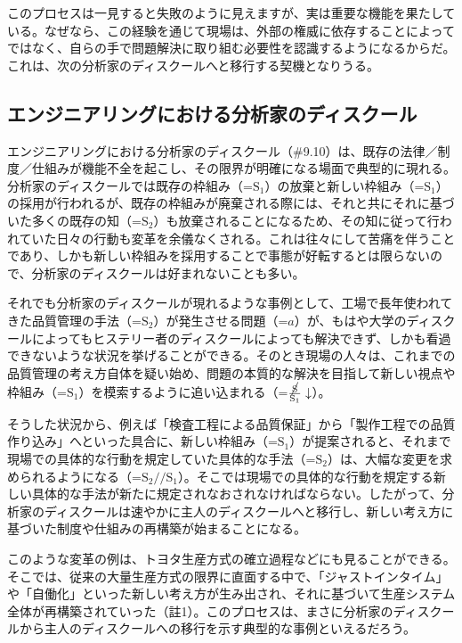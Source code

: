 このプロセスは一見すると失敗のように見えますが、実は重要な機能を果たしている。なぜなら、この経験を通じて現場は、外部の権威に依存することによってではなく、自らの手で問題解決に取り組む必要性を認識するようになるからだ。これは、次の分析家のディスクールへと移行する契機となりうる。

\subsection{エンジニアリングにおける分析家のディスクール}\label{ux30a8ux30f3ux30b8ux30cbux30a2ux30eaux30f3ux30b0ux306bux304aux3051ux308bux5206ux6790ux5bb6ux306eux30c7ux30a3ux30b9ux30afux30fcux30eb}

エンジニアリングにおける分析家のディスクール（\#9.10）は、既存の法律／制度／仕組みが機能不全を起こし、その限界が明確になる場面で典型的に現れる。分析家のディスクールでは既存の枠組み（=\(\textrm{S}_1\)）の放棄と新しい枠組み（=\(\textrm{S}_1\)）の採用が行われるが、既存の枠組みが廃棄される際には、それと共にそれに基づいた多くの既存の知（=\(\textrm{S}_2\)）も放棄されることになるため、その知に従って行われていた日々の行動も変革を余儀なくされる。これは往々にして苦痛を伴うことであり、しかも新しい枠組みを採用することで事態が好転するとは限らないので、分析家のディスクールは好まれないことも多い。

それでも分析家のディスクールが現れるような事例として、工場で長年使われてきた品質管理の手法（=\(\textrm{S}_2\)）が発生させる問題（=\(a\)）が、もはや大学のディスクールによってもヒステリー者のディスクールによっても解決できず、しかも看過できないような状況を挙げることができる。そのとき現場の人々は、これまでの品質管理の考え方自体を疑い始め、問題の本質的な解決を目指して新しい視点や枠組み（=\(\textrm{S}_1\)）を模索するように追い込まれる（=\(\frac{\cancel{\textrm{S}}}{\textrm{S}_1}\downarrow\)）。

そうした状況から、例えば「検査工程による品質保証」から「製作工程での品質作り込み」へといった具合に、新しい枠組み（=\(\textrm{S}_1\)）が提案されると、それまで現場での具体的な行動を規定していた具体的な手法（=\(\textrm{S}_2\)）は、大幅な変更を求められるようになる（=\(\textrm{S}_2//\textrm{S}_1\)）。そこでは現場での具体的な行動を規定する新しい具体的な手法が新たに規定されなおされなければならない。したがって、分析家のディスクールは速やかに主人のディスクールへと移行し、新しい考え方に基づいた制度や仕組みの再構築が始まることになる。

このような変革の例は、トヨタ生産方式の確立過程などにも見ることができる。そこでは、従来の大量生産方式の限界に直面する中で、「ジャストインタイム」や「自働化」といった新しい考え方が生み出され、それに基づいて生産システム全体が再構築されていった（註1）。このプロセスは、まさに分析家のディスクールから主人のディスクールへの移行を示す典型的な事例といえるだろう。

